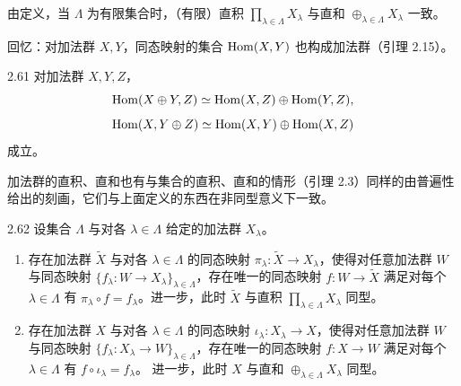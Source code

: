 由定义，当 $\Lambda$ 为有限集合时，（有限）直积 $\prod_{\lambda\in\Lambda}X_\lambda$ 与直和 $\oplus_{\lambda\in\Lambda}X_\lambda$ 一致。


回忆：对加法群 $X,Y$，同态映射的集合 $\operatorname{Hom}(X,Y)$ 也构成加法群（引理 2.15）。

\begin{lemma}{2.61} 对加法群 $X,Y,Z$，
\[
  \operatorname{Hom}(X\oplus Y,Z)\simeq\operatorname{Hom}(X,Z)\oplus\operatorname{Hom}(Y,Z),
\]
\[
  \operatorname{Hom}(X,Y\oplus Z)\simeq\operatorname{Hom}(X,Y)\oplus\operatorname{Hom}(X,Z)
\]
成立。\end{lemma}


加法群的直积、直和也有与集合的直积、直和的情形（引理 2.3）同样的由普遍性给出的刻画，它们与上面定义的东西在非同型意义下一致。

\begin{lemma}{2.62} 设集合 $\Lambda$ 与对各 $\lambda\in\Lambda$ 给定的加法群 $X_\lambda$。
\begin{enumerate}[label=(\alph*), leftmargin=*]
  \item 存在加法群 $\tilde{X}$ 与对各 $\lambda\in\Lambda$ 的同态映射 $\pi_\lambda\colon \tilde{X}\to X_\lambda$，使得对任意加法群 $W$ 与同态映射 $\{f_\lambda\colon W\to X_\lambda\}_{\lambda\in\Lambda}$，存在唯一的同态映射 $f\colon W\to\tilde{X}$ 满足对每个 $\lambda\in\Lambda$ 有 $\pi_\lambda\circ f=f_\lambda$。进一步，此时 $\tilde{X}$ 与直积 $\prod_{\lambda\in\Lambda}X_\lambda$ 同型。
  \item 存在加法群 $X$ 与对各 $\lambda\in\Lambda$ 的同态映射 $\iota_\lambda\colon X_\lambda\to X$，使得对任意加法群 $W$ 与同态映射 $\{f_\lambda\colon X_\lambda\to W\}_{\lambda\in\Lambda}$，存在唯一的同态映射 $f\colon X\to W$ 满足对每个 $\lambda\in\Lambda$ 有 $f\circ\iota_\lambda=f_\lambda$。
  进一步，此时 $X$ 与直和 $\oplus_{\lambda\in\Lambda}X_\lambda$ 同型。
\end{enumerate}
\end{lemma}

